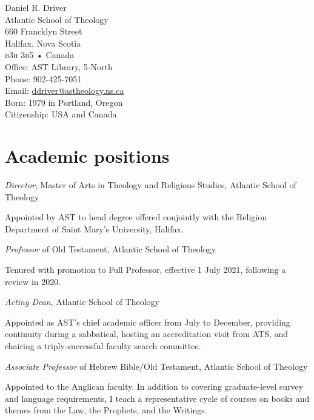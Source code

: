 \documentclass[11pt]{article}
\newcommand{\years}[1]{\marginnote{\footnotesize #1}}
\begin{document}
{\Huge Daniel R. Driver}\\[3em]
%
Atlantic School of Theology\\
660 Francklyn Street\\
Halifax, Nova Scotia\\
\textsc{b3h 3b5} • Canada\\[1em]
%
Office: AST Library, 5-North\\
Phone: 902-425-7051\\
Email: \href{mailto:ddriver@astheology.ns.ca}{ddriver@astheology.ns.ca}\\[1em]
%
Born: 1979 in Portland, Oregon\\
Citizenship: USA and Canada
\vfill

\section*{Academic positions}
\years{2022---}
\emph{Director}, Master of Arts in Theology and Religious Studies, Atlantic School of Theology
	\begin{quoting}
	Appointed by AST to head degree offered conjointly with the Religion Department of Saint Mary’s University, Halifax.
	\end{quoting}


\years{2021---} \emph{Professor} of Old Testament, Atlantic School of Theology
	\begin{quoting}
	Tenured with promotion to Full Professor, effective 1 July 2021, following a review in 2020.
	\end{quoting}

\years{2020} \emph{Acting Dean}, Atlantic School of Theology
	\begin{quoting}
	Appointed as AST's chief academic officer from July to December, providing continuity during a sabbatical, hosting an accreditation visit from ATS, and chairing a triply-successful faculty search committee.
	\end{quoting}

\years{2016--2021} \emph{Associate Professor} of Hebrew Bible/Old Testament, Atlantic School of Theology
	\begin{quoting}
	Appointed to the Anglican faculty. In addition to covering
	graduate-level survey and language requirements, I teach a
	representative cycle of courses on books and themes from the Law,
	the Prophets, and the Writings.
	\end{quoting}
\end{document}
